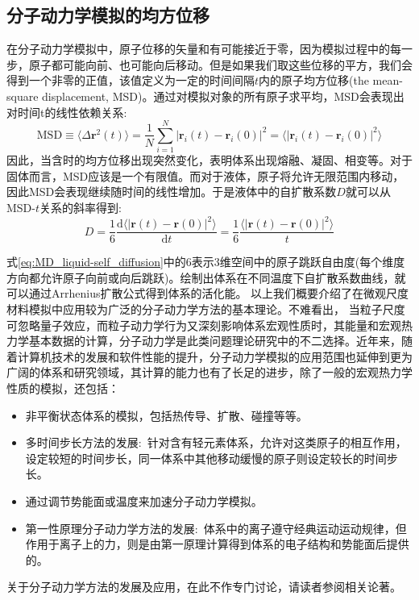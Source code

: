 \subsection{分子动力学模拟的均方位移}
在分子动力学模拟中，原子位移的矢量和有可能接近于零，因为模拟过程中的每一步，原子都可能向前、也可能向后移动。但是如果我们取这些位移的平方，我们会得到一个非零的正值，该值定义为一定的时间间隔$t$内的原子均方位移\textrm{(the mean-square displacement, MSD)}。通过对模拟对象的所有原子求平均，\textrm{MSD}会表现出对时间t的线性依赖关系:
\begin{equation}
	\mathrm{MSD}\equiv\langle\Delta\mathbf{r}^2(t)\rangle=\dfrac1N\sum_{i=1}^N|\mathbf{r}_i(t)-\mathbf{r}_i(0)|^2=\big\langle|\mathbf{r}_i(t)-\mathbf{r}_i(0)|^2\big\rangle
	\label{eq:MD_MSD}
\end{equation}
因此，当含时的均方位移出现突然变化，表明体系出现熔融、凝固、相变等。对于固体而言，\textrm{MSD}应该是一个有限值。而对于液体，原子将允许无限范围内移动，因此\textrm{MSD}会表现继续随时间的线性增加。于是液体中的自扩散系数$D$就可以从\textrm{MSD}-$t$关系的斜率得到:
\begin{equation}
	D=\dfrac16\dfrac{\mathrm{d}\langle|\mathbf{r}(t)-\mathbf{r}(0)|^2\rangle}{\mathrm{d}t}=\dfrac16\dfrac{\langle|\mathbf{r}(t)-\mathbf{r}(0)|^2\rangle}{t}
	\label{eq:MD_liquid-self_diffusion}
\end{equation}

式\eqref{eq:MD_liquid-self_diffusion}中的6表示3维空间中的原子跳跃自由度(每个维度方向都允许原子向前或向后跳跃)。绘制出体系在不同温度下自扩散系数曲线，就可以通过\textrm{Arrhenius}扩散公式得到体系的活化能。
\vskip 5pt
以上我们概要介绍了在微观尺度材料模拟中应用较为广泛的分子动力学方法的基本理论。不难看出，%
当粒子尺度可忽略量子效应，而粒子动力学行为又深刻影响体系宏观性质时，其能量和宏观热力学基本数据的计算，分子动力学是此类问题理论研究中的不二选择。近年来，随着计算机技术的发展和软件性能的提升，分子动力学模拟的应用范围也延伸到更为广阔的体系和研究领域，其计算的能力也有了长足的进步，除了一般的宏观热力学性质的模拟，还包括：
\begin{itemize}
	\item 非平衡状态体系的模拟\cite{CMP8-247_2005}，包括热传导、扩散、碰撞等等。
	\item 多时间步长方法的发展:~针对含有轻元素体系，允许对这类原子的相互作用，设定较短的时间步长，同一体系中其他移动缓慢的原子则设定较长的时间步长。
	\item 通过调节势能面或温度来加速分子动力学模拟\cite{JCP106-4665_1997,JCP112-9599_2000}。
	\item 第一性原理分子动力学方法的发展:~体系中的离子遵守经典运动运动规律，但作用于离子上的力，则是由第一原理计算得到体系的电子结构和势能面后提供的\cite{PRL55-2471_1985}。
\end{itemize}
关于分子动力学方法的发展及应用，在此不作专门讨论，请读者参阅相关论著。

